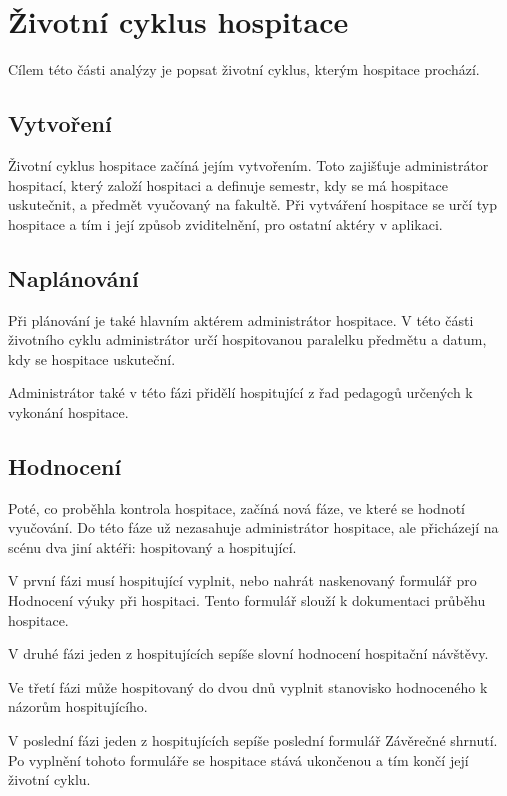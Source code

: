 \section{Životní cyklus hospitace}
Cílem této části analýzy je popsat životní cyklus, kterým hospitace prochází. 

\subsection{Vytvoření}
Životní cyklus hospitace začíná jejím vytvořením. Toto zajišťuje administrátor hospitací, který založí hospitaci a definuje semestr, kdy se má hospitace uskutečnit, a předmět vyučovaný na fakultě. Při vytváření hospitace se určí typ hospitace a tím i její způsob zviditelnění, pro ostatní aktéry v aplikaci.

\subsection{Naplánování}
Při plánování je také hlavním aktérem administrátor hospitace. V této části životního cyklu administrátor určí hospitovanou paralelku předmětu a datum,  kdy se hospitace uskuteční.  

Administrátor také v této fázi přidělí hospitující z řad pedagogů určených k vykonání hospitace.  
 
\subsection{Hodnocení}
Poté, co proběhla kontrola hospitace, začíná nová fáze, ve které se hodnotí vyučování. Do této fáze už nezasahuje administrátor hospitace, ale přicházejí na scénu dva jiní aktéři: hospitovaný a hospitující.

V první fázi musí hospitující vyplnit, nebo nahrát naskenovaný formulář pro Hodnocení výuky při hospitaci. Tento formulář slouží k dokumentaci průběhu hospitace.

V druhé fázi jeden z hospitujících sepíše slovní hodnocení hospitační návštěvy.

Ve třetí fázi může hospitovaný do dvou dnů vyplnit stanovisko hodnoceného k názorům hospitujícího.  

V poslední fázi jeden z hospitujících sepíše poslední formulář Závěrečné shrnutí. Po vyplnění tohoto formuláře se hospitace stává ukončenou a tím končí její životní cyklu.
 